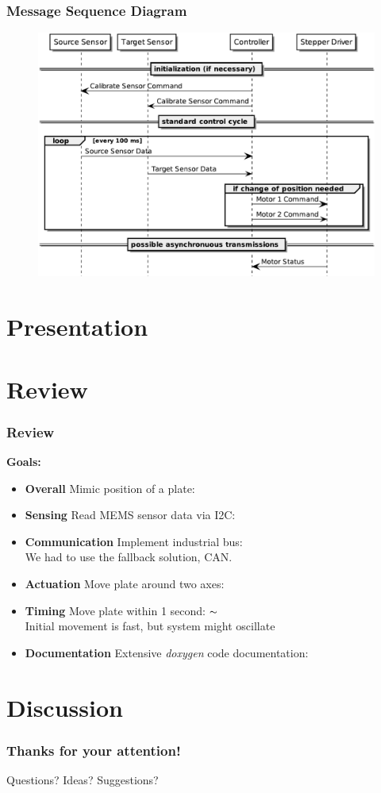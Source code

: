 \documentclass{beamer}
\begin{document}
\begin{frame}
  \frametitle{Message Sequence Diagram}
  \begin{figure}
    \includegraphics[height=0.78\textheight]{nes-message_sequence.pdf}
    \vspace{0.05\textheight}
  \end{figure}
\end{frame}

\section{Presentation}

\section{Review}
\begin{frame}
	\frametitle{Review}
	\textbf{Goals:}
	\begin{itemize}
		\item \textbf{Overall} Mimic position of a plate: \checkmark
		\vfill
		\item \textbf{Sensing} Read MEMS sensor data via I2C: \checkmark
		\item \textbf{Communication} Implement industrial bus: \checkmark \\
			We had to use the fallback solution, CAN.
		\item \textbf{Actuation} Move plate around two axes: \checkmark
		\item \textbf{Timing} Move plate within 1 second: $\thicksim$ \\
			Initial movement is fast, but system might oscillate
		\item \textbf{Documentation} Extensive \emph{doxygen} code documentation: \checkmark
	\end{itemize}
\end{frame}

\section{Discussion}
\begin{frame}
  \frametitle{Thanks for your attention!}
  \huge{Questions? Ideas? Suggestions?}
\end{frame}
\end{document}
